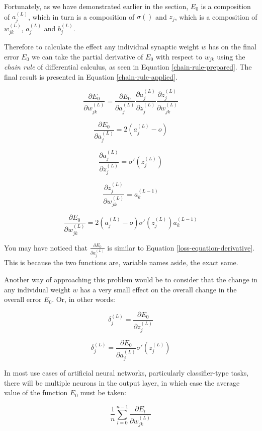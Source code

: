 \documentclass[12pt]{article}
\begin{document}
Fortunately, as we have demonstrated earlier in the section, $E_0$ is a composition of $a_j^{(L)}$, which in turn is a composition of $\sigma ()$ and $z_j$, which is a composition of $w_{jk}^{(L)}$, $a_j^{(L)}$ and $b_j^{(L)}$.

Therefore to calculate the effect any individual synaptic weight $w$ has on the final error $E_0$ we can take the partial derivative of $E_0$ with respect to $w_{jk}$ using the \textit{chain rule} of differential calculus, as seen in Equation \ref{chain-rule-prepared}. The final result is presented in Equation \ref{chain-rule-applied}.

\begin{equation} \label{chain-rule-prepared}
  \frac{\partial E_0}{\partial w_{jk}^{(L)}} = \frac{\partial E_0}{\partial a_j^{(L)}} \frac{\partial a_j^{(L)}}{\partial z_j^{(L)}} \frac{\partial z_j^{(L)}}{\partial w_{jk}^{(L)}}
\end{equation}

\[ \frac{\partial E_0}{\partial a_j^{(L)}} = 2 (a_j^{(L)} - o)\]

\[ \frac{\partial a_j^{(L)}}{\partial z_j^{(L)}} = \sigma '(z_j^{(L)}) \]

\[ \frac{\partial z_j^{(L)}}{\partial w_{jk}^{(L)}} = a_k^{(L-1)}\]

\begin{equation} \label{chain-rule-applied}
  \frac{\partial E_0}{\partial w_{jk}^{(L)}} = 2 (a_j^{(L)} - o) \sigma '(z_j^{(L)}) a_k^{(L-1)}
\end{equation}

You may have noticed that $\frac{\partial E_0}{\partial a_j^{(L)}}$ is similar to Equation \ref{loss-equation-derivative}. This is because the two functions are, variable names aside, the exact same.

Another way of approaching this problem would be to consider that the change in any individual weight $w$ has a very small effect on the overall change in the overall error $E_0$. Or, in other words:

\[ \delta_{j}^{(L)} = \frac{\partial E_0}{\partial z_j^{(L)}} \]

\[ \delta_j^{(L)} = \frac{\partial E_0}{\partial a_j^{(L)}} \sigma '(z_j^{(L)})\]

In most use cases of artificial neural networks, particularly classifier-type tasks, there will be multiple neurons in the output layer, in which case the average value of the function $E_0$ must be taken:

\[ \frac{1}{n}\sum_{l=0}^{n-1} \frac{\partial E_l}{\partial w_{jk}^{(L)}}\]
\end{document}
